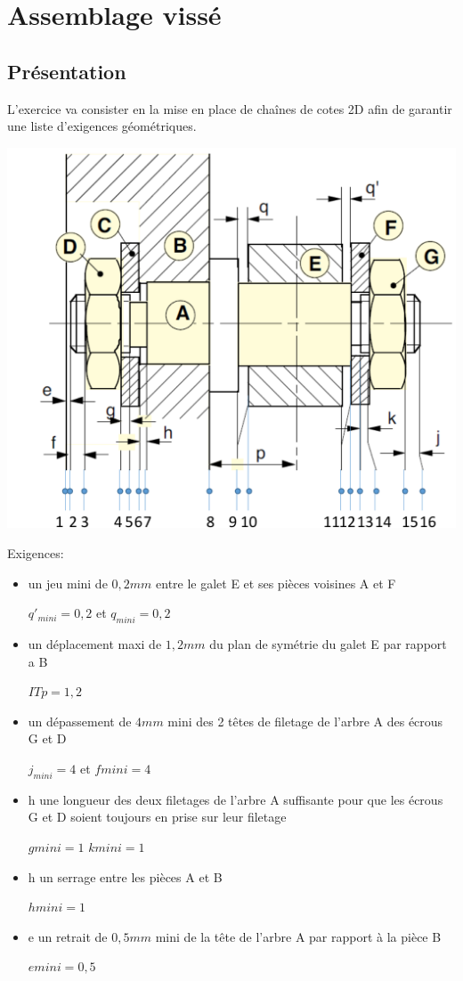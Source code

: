 

\section{Assemblage vissé}

\subsection{Présentation}

L'exercice va consister en la mise en place de chaînes de cotes 2D afin de garantir une liste d'exigences géométriques.

\begin{center}
 \includegraphics[width=0.7\linewidth]{img/Specifs_num}
\end{center}

Exigences:
\begin{itemize}
 \item un jeu mini de $0,2mm$ entre le galet E et ses pièces voisines A et F
 
 $q'_{mini} = 0,2$ et  $q_{mini} = 0,2$
 \item un déplacement maxi de $1,2mm$ du plan de symétrie du galet E par rapport a B

 $IT p = 1,2$ 
 \item un dépassement de $4mm$ mini des 2 têtes de filetage de l'arbre A des écrous G et D

 $j_{mini} = 4$ et $f mini = 4$
 \item h une longueur des deux filetages de l'arbre A suffisante pour que les écrous G et D soient toujours en prise sur leur filetage
 
 $g mini = 1$
 $k mini = 1$
 \item h un serrage entre les pièces A et B

 $h mini = 1$
 \item e un retrait de $0,5mm$ mini de la tête de l'arbre A par rapport à la pièce B

 $e mini = 0,5$
\end{itemize}

